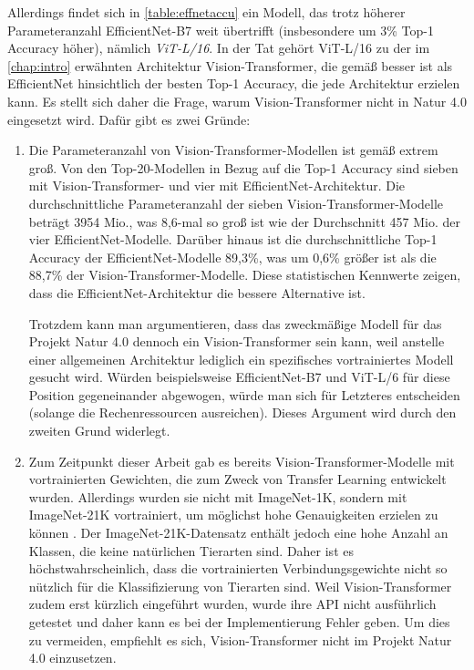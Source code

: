 Allerdings findet sich in \autoref{table:effnetaccu} ein Modell, das trotz höherer Parameteranzahl EfficientNet-B7 weit übertrifft (insbesondere um 3\% Top-1 Accuracy höher), nämlich \emph{ViT-L/16}. In der Tat gehört ViT-L/16 zu der im \autoref{chap:intro} erwähnten Architektur Vision-Transformer, die gemäß \cite{PapersWithCode-ImageNet} besser ist als EfficientNet hinsichtlich der besten Top-1 Accuracy, die jede Architektur erzielen kann. Es stellt sich daher die Frage, warum Vision-Transformer nicht in Natur 4.0 eingesetzt wird. Dafür gibt es zwei Gründe:

\begin{enumerate}
	\item Die Parameteranzahl von Vision-Transformer-Modellen ist gemäß \cite{PapersWithCode-ImageNet} extrem groß. Von den Top-20-Modellen in Bezug auf die Top-1 Accuracy sind sieben mit Vision-Transformer- und vier mit EfficientNet-Architektur. Die durchschnittliche Parameteranzahl der sieben Vision-Transformer-Modelle beträgt 3954 Mio., was 8,6-mal so groß ist wie der Durchschnitt 457 Mio. der vier EfficientNet-Modelle. Darüber hinaus ist die durchschnittliche Top-1 Accuracy der EfficientNet-Modelle 89,3\%, was um 0,6\% größer ist als die 88,7\% der Vision-Transformer-Modelle. Diese statistischen Kennwerte zeigen, dass die EfficientNet-Architektur die bessere Alternative ist.
	
	Trotzdem kann man argumentieren, dass das zweckmäßige Modell für das Projekt Natur 4.0 dennoch ein Vision-Transformer sein kann, weil anstelle einer allgemeinen Architektur lediglich ein spezifisches vortrainiertes Modell gesucht wird. Würden beispielsweise EfficientNet-B7 und ViT-L/6 für diese Position gegeneinander abgewogen, würde man sich für Letzteres entscheiden (solange die Rechenressourcen ausreichen). Dieses Argument wird durch den zweiten Grund widerlegt.
	
	\item Zum Zeitpunkt dieser Arbeit gab es bereits Vision-Transformer-Modelle mit vortrainierten Gewichten, die zum Zweck von Transfer Learning entwickelt wurden. Allerdings wurden sie nicht mit ImageNet-1K, sondern mit ImageNet-21K vortrainiert, um möglichst hohe Genauigkeiten erzielen zu können \cite[6]{dosovitskiy2021image}. Der ImageNet-21K-Datensatz enthält jedoch eine hohe Anzahl an Klassen, die keine natürlichen Tierarten sind. Daher ist es höchstwahrscheinlich, dass die vortrainierten Verbindungsgewichte nicht so nützlich für die Klassifizierung von Tierarten sind. Weil Vision-Transformer zudem erst kürzlich eingeführt wurden, wurde ihre API nicht ausführlich getestet und daher kann es bei der Implementierung Fehler geben. Um dies zu vermeiden, empfiehlt es sich, Vision-Transformer nicht im Projekt Natur 4.0 einzusetzen.
\end{enumerate}

